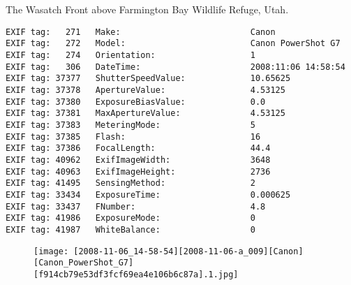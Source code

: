 \section{\protect{}}
\noindent The Wasatch Front above Farmington Bay Wildlife Refuge, Utah.
\noindent
\begin{lstlisting}
EXIF tag:   271   Make:                          Canon
EXIF tag:   272   Model:                         Canon PowerShot G7
EXIF tag:   274   Orientation:                   1
EXIF tag:   306   DateTime:                      2008:11:06 14:58:54
EXIF tag: 37377   ShutterSpeedValue:             10.65625
EXIF tag: 37378   ApertureValue:                 4.53125
EXIF tag: 37380   ExposureBiasValue:             0.0
EXIF tag: 37381   MaxApertureValue:              4.53125
EXIF tag: 37383   MeteringMode:                  5
EXIF tag: 37385   Flash:                         16
EXIF tag: 37386   FocalLength:                   44.4
EXIF tag: 40962   ExifImageWidth:                3648
EXIF tag: 40963   ExifImageHeight:               2736
EXIF tag: 41495   SensingMethod:                 2
EXIF tag: 33434   ExposureTime:                  0.000625
EXIF tag: 33437   FNumber:                       4.8
EXIF tag: 41986   ExposureMode:                  0
EXIF tag: 41987   WhiteBalance:                  0

\end{lstlisting}
\clearpage
\begin{figure}
\raggedleft
\texttt{[image: [2008-11-06\_14-58-54][2008-11-06-a\_009][Canon][Canon\_PowerShot\_G7][f914cb79e53df3fcf69ea4e106b6c87a].1.jpg]}
\end{figure}


\clearpage
